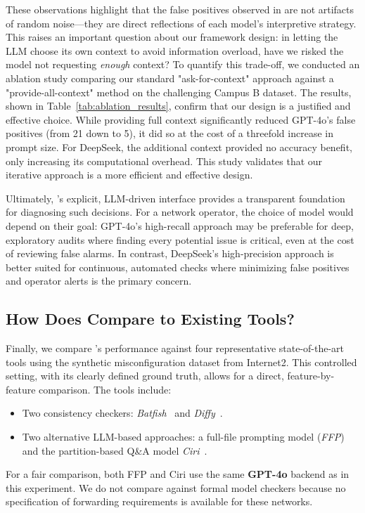 These observations highlight that the false positives observed in \sysname{} are not artifacts of random noise—they are direct reflections of each model’s interpretive strategy.
This raises an important question about our framework design: in letting the LLM choose its own context to avoid information overload, have we risked the model not requesting \textit{enough} context? To quantify this trade-off, we conducted an ablation study comparing our standard "ask-for-context" approach against a "provide-all-context" method on the challenging Campus B dataset. The results, shown in Table~\ref{tab:ablation_results}, confirm that our design is a justified and effective choice. While providing full context significantly reduced GPT-4o's false positives (from 21 down to 5), it did so at the cost of a threefold increase in prompt size. For DeepSeek, the additional context provided no accuracy benefit, only increasing its computational overhead. This study validates that our iterative approach is a more efficient and effective design.


Ultimately, \sysname{}’s explicit, LLM-driven interface provides a transparent foundation for diagnosing such decisions. For a network operator, the choice of model would depend on their goal: GPT-4o's high-recall approach may be preferable for deep, exploratory audits where finding every potential issue is critical, even at the cost of reviewing false alarms. In contrast, DeepSeek's high-precision approach is better suited for continuous, automated checks where minimizing false positives and operator alerts is the primary concern.

\subsection{How Does \sysname{} Compare to Existing Tools?}

Finally, we compare \sysname{}'s performance against four representative state-of-the-art tools using the synthetic misconfiguration dataset from Internet2. This controlled setting, with its clearly defined ground truth, allows for a direct, feature-by-feature comparison. The tools include:
\begin{itemize}
    \item Two consistency checkers: \textit{Batfish}~\cite{fogel2015general} and \textit{Diffy}~\cite{kakarla2024diffy}.
    \item Two alternative LLM-based approaches: a full-file prompting model (\textit{FFP}) and the partition-based Q\&A model \textit{Ciri}~\cite{lian2023configuration}.
\end{itemize}
For a fair comparison, both FFP and Ciri use the same \textbf{GPT-4o} backend as \sysname{} in this experiment. We do not compare against formal model checkers because no specification of forwarding requirements is available for these networks.

